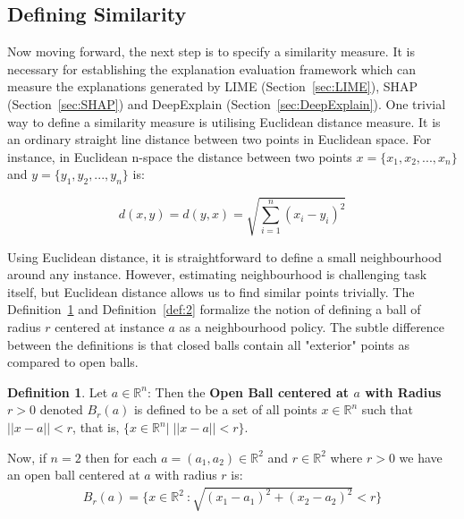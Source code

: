 \documentclass[english]{tktltiki2}
\theoremstyle{definition}
\newtheorem{definition}[thm]{Definition}
\theoremstyle{remark}
\begin{document}
%
%
%




\subsection{Defining Similarity}\label{sec:defining_similarity} %
Now moving forward, the next step is to specify a similarity measure. It is necessary for establishing the explanation evaluation framework which can measure the explanations generated by LIME (Section~\ref{sec:LIME}), SHAP (Section~\ref{sec:SHAP}) and DeepExplain (Section~\ref{sec:DeepExplain}). One trivial way to define a similarity measure is utilising Euclidean distance measure. It is an ordinary straight line distance between two points in Euclidean space. For instance, in Euclidean n-space the distance between two points $x = \{x_1, x_2, ..., x_n\}$ and $y = \{y_1, y_2, ..., y_n\}$ is:

\begin{equation}\label{eq:euclidean_distance}
d(x,y) = d(y,x) = \sqrt{\sum_{i=1}^{n}(x_i - y_i)^2}
\end{equation}

Using Euclidean distance, it is straightforward to define a small neighbourhood around any instance. However, estimating neighbourhood is challenging task itself, but Euclidean distance allows us to find similar points trivially. The Definition~\ref{def:1} and Definition~\ref{def:2} formalize the notion of defining a ball of radius $r$ centered at instance $a$ as a neighbourhood policy. The subtle difference between the definitions is that closed balls contain all "exterior" points as compared to open balls.

\begin{definition}\label{def:1}{Let $a \in {\mathbb{R}}^n$: Then the \textbf{Open Ball centered at $a$ with Radius $r > 0$} denoted $B_{r}(a)$ is defined to be a set of all points $x \in {\mathbb{R}}^n$ such that $||x-a|| < r$, that is, $\{x \in {\mathbb{R}}^n |\;||x - a|| < r\}.$}
\end{definition}
Now, if $n=2$ then for each $a = (a_1,a_2) \in {\mathbb{R}}^2$ and $r \in {\mathbb{R}}^2$ where $r > 0$ we have an open ball centered at $a$ with radius $r$ is:
\begin{align*}
B_{r}(a) = \{x \in {\mathbb{R}}^2\ : \sqrt{(x_1 - a_1)^2 + (x_2 - a_2)^2} < r\}
\end{align*}
\end{document}
